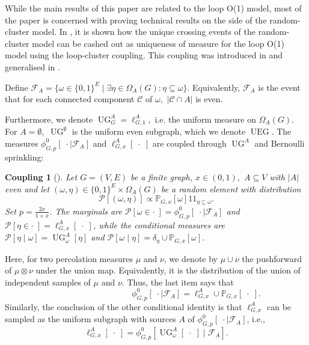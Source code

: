 \documentclass[article,11pt,reqno]{amsart}
\newcommand{\id}{1\! \!1}
\newtheorem{coupling}[theorem]{Coupling}
\begin{document}
While the main results of this paper are related to the loop O(1) model, most of the paper is concerned with proving technical results on the side of the random-cluster model. 
In , it is shown how the unique crossing events of the random-cluster model can be cashed out as uniqueness of measure for the loop O(1) model using the loop-cluster coupling. 
This coupling was introduced in \cite{evertz2002new, grimmett2007random} and generalised in \cite{aizenman2019emergent,hansen2025general,zhang2020loop}.

Define $\mathcal{F}_A=\{\omega\in \{0,1\}^E\mid \exists \eta \in \Omega_A(G):\eta\subseteq \omega\}.$ Equivalently, $\mathcal{F}_A$ is the event that for each connected component $\mathcal{C}$ of $\omega,$ $|\mathcal{C}\cap A|$ is even. 

Furthermore, we denote $\operatorname{UG}^A_G=\ell^A_{G,1},$ i.e. the uniform measure on $\Omega_A(G)$. For $A=\emptyset,$ $\operatorname{UG}^{\emptyset}$ is the uniform even subgraph, which we denote $\operatorname{UEG}$.
The measures $\phi^0_{G,p}[\;\cdot\mid \mathcal{F}_A]$ and $\ell^A_{G,x}[\;\cdot\;]$ are coupled through $\operatorname{UG}^A$ and Bernoulli sprinkling: 
\begin{coupling}[\cite{aizenman2019emergent,evertz2002new, grimmett2007random}] \label{Thm:The_Coupling}
Let $G=(V,E)$ be a finite graph, $x\in (0,1),$ $A\subseteq V$ with $|A|$ even and let $(\omega,\eta)\in \{0,1\}^E\times \Omega_A(G)$ be a random element with distribution
$$
\mathscr{P}[(\omega,\eta)]\propto \mathbb{P}_{G,x}[\omega]\id_{\eta\subseteq \omega}.
$$
Set $p = \frac{2x}{1+x}$. The marginals are $\mathscr{P}[\omega\in\cdot\;]=\phi^0_{G,p}[\;\cdot\mid \mathcal{F}_A]$ and $\mathscr{P}[\eta\in \cdot\;]=\ell^A_{G,x}[\;\cdot\;]$, while the conditional measures are $\mathscr{P}[\eta\mid \omega]=\operatorname{UG}^A_{\omega}[\eta]$ and $\mathscr{P}[\omega\mid \eta]=\delta_{\eta}\cup \mathbb{P}_{G,x}[\omega].$ 
\end{coupling}
Here, for two percolation measures $\mu$ and $\nu$, we denote by $\mu\cup \nu$ the pushforward of $\mu\otimes \nu$ under the union map. Equivalently, it is the distribution of the union of independent samples of $\mu$ and $\nu$. Thus, the last item says that 
\begin{equation} \label{FK_is_sprinkled_O(1)}
\hspace{4cm}\phi^0_{G,p}[\;\cdot \mid \mathcal{F}_A]=\ell^A_{G,x}\cup \mathbb{P}_{G,x} \tag{FK is sprinkled O($1$)}[\;\cdot\;].
\end{equation}
Similarly, the conclusion of the other conditional identity is that  $\ell_{G,x}^A$ can be sampled as the uniform subgraph with sources $A$ of $\phi^0_{G,p}[\;\cdot \mid \mathcal{F}_A]$, i.e.,
\begin{equation} \label{O(1)_as_ueg}
\ell^A_{G,x}[\;\cdot\;]=\phi^0_{G,p}[\operatorname{UG}^A_{\omega}[\;\cdot\;]\mid \mathcal{F}_A]. 
\end{equation}
\end{document}
